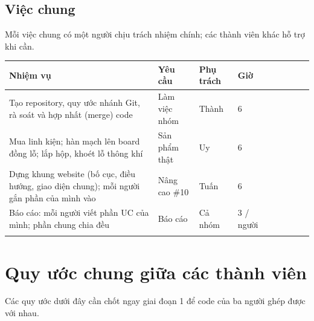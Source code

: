 \documentclass[12pt,a4paper]{article}
\newcommand{\outerline}{\Xhline{0.9pt}}
\begin{document}
\noindent\begin{minipage}{\linewidth}
\setlength{\parskip}{6pt}
\subsection{Việc chung}
Mỗi việc chung có một người chịu trách nhiệm chính; các thành viên khác hỗ trợ khi cần.

\begin{tabularx}{\linewidth}{I Y i L{2.6cm} i C{1.6cm} i C{1.4cm} I}
\outerline
\textbf{Nhiệm vụ} & \textbf{Yêu cầu} & \textbf{Phụ trách} & \textbf{Giờ} \\
\hline
Tạo repository, quy ước nhánh Git, rà soát và hợp nhất (merge) code & Làm việc nhóm & Thành & 6 \\
\hline
Mua linh kiện; hàn mạch lên board đồng lỗ; lắp hộp, khoét lỗ thông khí & Sản phẩm thật & Uy & 6 \\
\hline
Dựng khung website (bố cục, điều hướng, giao diện chung); mỗi người gắn phần của mình vào & Nâng cao \#10 & Tuấn & 6 \\
\hline
Báo cáo: mỗi người viết phần UC của mình; phần chung chia đều & Báo cáo & Cả nhóm & 3 / người \\
\outerline
\end{tabularx}
\end{minipage}
\par\bigskip

\section{Quy ước chung giữa các thành viên}
Các quy ước dưới đây cần chốt ngay giai đoạn 1 để code của ba người ghép được với nhau.
\end{document}
